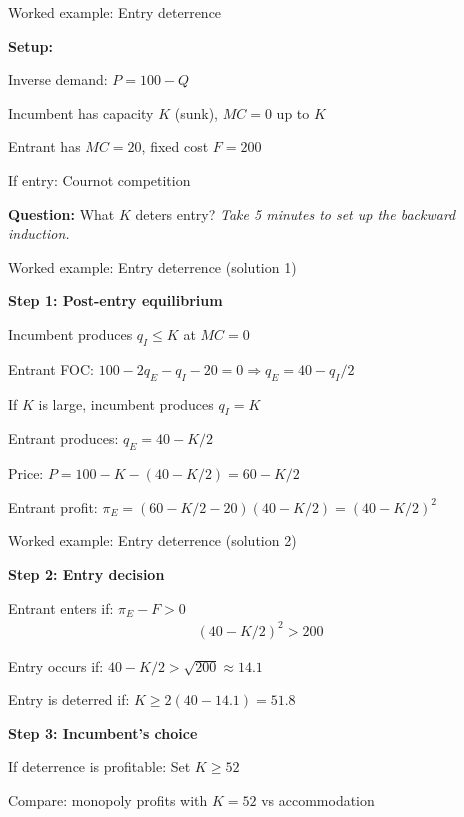 \documentclass[notes,11pt, aspectratio=169]{beamer}
\newenvironment{wideitemize}{\itemize\addtolength{\itemsep}{10pt}}{\enditemize}
\begin{document}
\begin{frame}{Worked example: Entry deterrence}
	\begin{wideitemize}
		\item \textbf{Setup:}
		\item Inverse demand: $P = 100 - Q$
		\item Incumbent has capacity $K$ (sunk), $MC = 0$ up to $K$
		\item Entrant has $MC = 20$, fixed cost $F = 200$
		\item If entry: Cournot competition
		\item \textbf{Question:} What $K$ deters entry?
	\end{wideitemize}
	\vspace{10pt}
	\centering
	\textit{Take 5 minutes to set up the backward induction.}
\end{frame}

\begin{frame}{Worked example: Entry deterrence (solution 1)}
	\begin{wideitemize}
		\item \textbf{Step 1: Post-entry equilibrium}
		\item Incumbent produces $q_I \leq K$ at $MC = 0$
		\item Entrant FOC: $100 - 2q_E - q_I - 20 = 0 \Rightarrow q_E = 40 - q_I/2$
		\item If $K$ is large, incumbent produces $q_I = K$
		\item Entrant produces: $q_E = 40 - K/2$
		\item Price: $P = 100 - K - (40 - K/2) = 60 - K/2$
		\item Entrant profit: $\pi_E = (60 - K/2 - 20)(40 - K/2) = (40 - K/2)^2$
	\end{wideitemize}
\end{frame}

\begin{frame}{Worked example: Entry deterrence (solution 2)}
	\begin{wideitemize}
		\item \textbf{Step 2: Entry decision}
		\item Entrant enters if: $\pi_E - F > 0$
		\begin{align*}
			(40 - K/2)^2 > 200
		\end{align*}
		\item Entry occurs if: $40 - K/2 > \sqrt{200} \approx 14.1$
		\item Entry is deterred if: $K \geq 2(40 - 14.1) = 51.8$
		\item \textbf{Step 3: Incumbent's choice}
		\item If deterrence is profitable: Set $K \geq 52$
		\item Compare: monopoly profits with $K = 52$ vs accommodation
	\end{wideitemize}
\end{frame}
\end{document}

